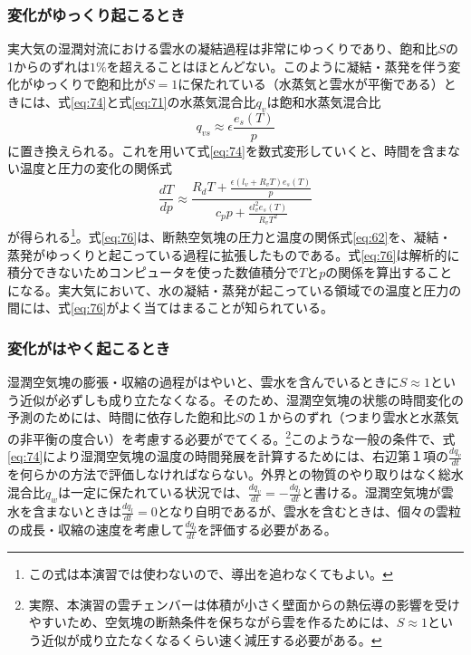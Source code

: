 \documentclass{ltjsarticle}
\begin{document}
\subsubsection{変化がゆっくり起こるとき}
実大気の湿潤対流における雲水の凝結過程は非常にゆっくりであり、飽和比$S$の1からのずれは$1\%$を超えることはほとんどない。このように凝結・蒸発を伴う変化がゆっくりで飽和比が$S=1$に保たれている（水蒸気と雲水が平衡である）ときには、式\eqref{eq:74}と式\eqref{eq:71}の水蒸気混合比$q_{v}$は飽和水蒸気混合比
\begin{equation}\label{eq:75}
q_{vs}\approx \epsilon \frac{e_s(T)}{p}
\end{equation}
に置き換えられる。これを用いて式\eqref{eq:74}を数式変形していくと、時間を含まない温度と圧力の変化の関係式
\begin{equation}\label{eq:76}
\frac{dT}{dp} \approx \frac{ R_{d}T + \frac{\epsilon (l_{v}+R_{v}T)e_{s}(T)}{p} }{c_{p}p + \frac{\epsilon l_{v}^{2}e_{s}(T)}{R_{v}T^2}}
\end{equation}
が得られる\footnote{この式は本演習では使わないので、導出を追わなくてもよい。}。式\eqref{eq:76}は、断熱空気塊の圧力と温度の関係式\eqref{eq:62}を、凝結・蒸発がゆっくりと起こっている過程に拡張したものである。式\eqref{eq:76}は解析的に積分できないためコンピュータを使った数値積分で$T$と$p$の関係を算出することになる。実大気において、水の凝結・蒸発が起こっている領域での温度と圧力の間には、式\eqref{eq:76}がよく当てはまることが知られている。

\subsubsection{変化がはやく起こるとき}
湿潤空気塊の膨張・収縮の過程がはやいと、雲水を含んでいるときに$S\approx 1$という近似が必ずしも成り立たなくなる。そのため、湿潤空気塊の状態の時間変化の予測のためには、時間に依存した飽和比$Sの１からのずれ$（つまり雲水と水蒸気の非平衡の度合い）を考慮する必要がでてくる。\footnote{実際、本演習の雲チェンバーは体積が小さく壁面からの熱伝導の影響を受けやすいため、空気塊の断熱条件を保ちながら雲を作るためには、$S\approx 1$という近似が成り立たなくなるくらい速く減圧する必要がある。}このような一般の条件で、式\eqref{eq:74}により湿潤空気塊の温度の時間発展を計算するためには、右辺第１項の$\frac{dq_{v}}{dt}$を何らかの方法で評価しなければならない。外界との物質のやり取りはなく総水混合比$q_{w}$は一定に保たれている状況では、$\frac{dq_{v}}{dt}=-\frac{dq_{l}}{dt}$と書ける。湿潤空気塊が雲水を含まないときは$\frac{dq_{l}}{dt}=0$となり自明であるが、雲水を含むときは、個々の雲粒の成長・収縮の速度を考慮して$\frac{dq_{l}}{dt}$を評価する必要がある。
\end{document}
